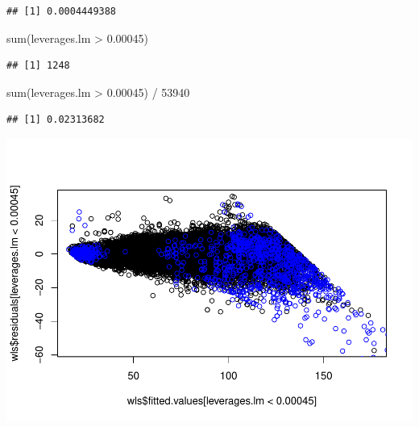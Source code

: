\documentclass[
]{book}
\newenvironment{Shaded}{\begin{snugshade}}{\end{snugshade}}
\newcommand{\AttributeTok}[1]{\textcolor[rgb]{0.77,0.63,0.00}{#1}}
\newcommand{\DecValTok}[1]{\textcolor[rgb]{0.00,0.00,0.81}{#1}}
\newcommand{\FloatTok}[1]{\textcolor[rgb]{0.00,0.00,0.81}{#1}}
\newcommand{\FunctionTok}[1]{\textcolor[rgb]{0.00,0.00,0.00}{#1}}
\newcommand{\NormalTok}[1]{#1}
\newcommand{\SpecialCharTok}[1]{\textcolor[rgb]{0.00,0.00,0.00}{#1}}
\newcommand{\StringTok}[1]{\textcolor[rgb]{0.31,0.60,0.02}{#1}}
\begin{document}
\begin{verbatim}
## [1] 0.0004449388
\end{verbatim}

\begin{Shaded}
\begin{Highlighting}[]
\FunctionTok{sum}\NormalTok{(leverages.lm }\SpecialCharTok{\textgreater{}} \FloatTok{0.00045}\NormalTok{)}
\end{Highlighting}
\end{Shaded}

\begin{verbatim}
## [1] 1248
\end{verbatim}

\begin{Shaded}
\begin{Highlighting}[]
\FunctionTok{sum}\NormalTok{(leverages.lm }\SpecialCharTok{\textgreater{}} \FloatTok{0.00045}\NormalTok{) }\SpecialCharTok{/} \DecValTok{53940}
\end{Highlighting}
\end{Shaded}

\begin{verbatim}
## [1] 0.02313682
\end{verbatim}

\begin{Shaded}
\end{Shaded}

\includegraphics{13-MultipleLinearRegression_files/figure-latex/unnamed-chunk-20-1.pdf}
\end{document}
